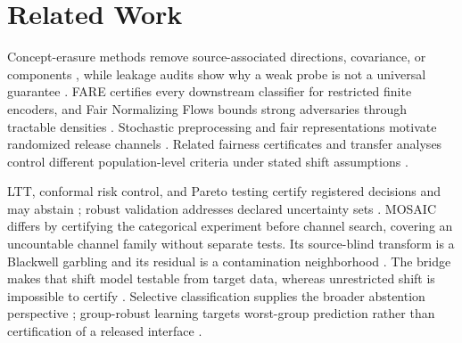 \section{Related Work}

Concept-erasure methods remove source-associated directions, covariance, or
components \citep{ravfogel2020null,ravfogel2022linear,belrose2023leace,
jourdan2023taco,avitan2026mance}, while leakage audits show why a weak probe is
not a universal guarantee \citep{pimentel2020probing,elazar2021amnesic,
chowdhury2025limits}. FARE certifies every downstream classifier for restricted
finite encoders, and Fair Normalizing Flows bounds strong adversaries through
tractable densities \citep{jovanovic2023fare,balunovic2022fnf}. Stochastic
preprocessing and fair representations motivate randomized release channels
\citep{calmon2017preprocessing,makhdoumi2014privacyfunnel,agarwal2024randomization}.
Related fairness certificates and transfer analyses control different
population-level criteria under stated shift assumptions
\citep{gitiaux2021smooth,chen2022fairness,kang2022certifying,
agarwal2025robustfair}.

LTT, conformal risk control, and Pareto testing certify registered decisions and
may abstain \citep{bates2021rcps,angelopoulos2025ltt,angelopoulos2024crc,
laufer2023pareto}; robust validation addresses declared uncertainty sets
\citep{tibshirani2019covariate,cauchois2024robust}. MOSAIC differs by certifying
the categorical experiment before channel search, covering an uncountable
channel family without separate tests. Its source-blind transform is a
Blackwell garbling and its residual is a contamination neighborhood
\citep{blackwell1953experiments,lecam1964sufficiency,torgersen1991experiments,
huber1964robust}. The bridge makes that shift model testable from target data,
whereas unrestricted shift is impossible to certify
\citep{bendavid2010impossibility,klivans2024testable,chandrasekaran2025learning}.
Selective classification supplies the broader abstention perspective
\citep{elyaniv2010foundations,geifman2017selective}; group-robust learning
targets worst-group prediction rather than certification of a released
interface \citep{sagawa2020groupdro}.

